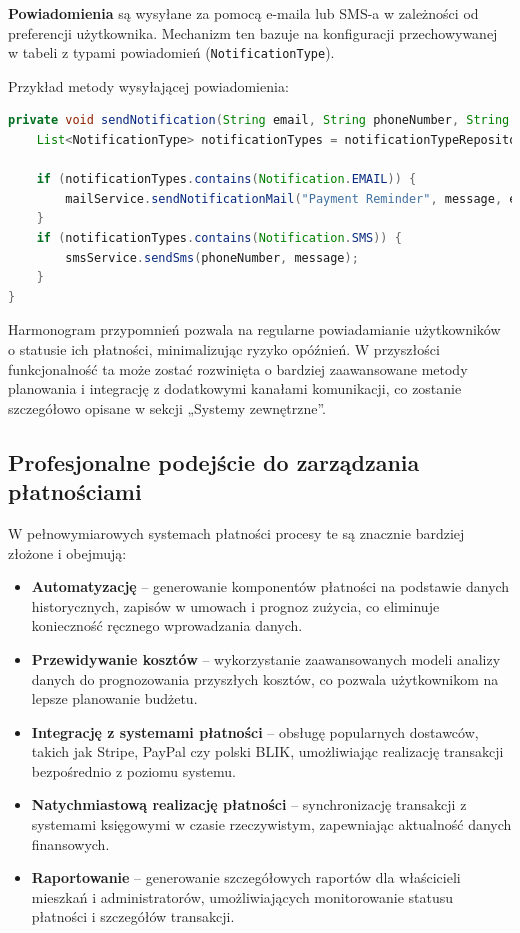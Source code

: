 \textbf{Powiadomienia} są wysyłane za pomocą e-maila lub SMS-a w zależności od preferencji użytkownika. Mechanizm ten bazuje na konfiguracji przechowywanej w tabeli z typami powiadomień (\texttt{NotificationType}).

Przykład metody wysyłającej powiadomienia:
\begin{lstlisting}[language=Java, caption=Wysyłanie powiadomień]
private void sendNotification(String email, String phoneNumber, String message) {
    List<NotificationType> notificationTypes = notificationTypeRepository.findByUserEmail(email);

    if (notificationTypes.contains(Notification.EMAIL)) {
        mailService.sendNotificationMail("Payment Reminder", message, email);
    }
    if (notificationTypes.contains(Notification.SMS)) {
        smsService.sendSms(phoneNumber, message);
    }
}
\end{lstlisting}

Harmonogram przypomnień pozwala na regularne powiadamianie użytkowników o statusie ich płatności, minimalizując ryzyko opóźnień. W przyszłości funkcjonalność ta może zostać rozwinięta o bardziej zaawansowane metody planowania i integrację z dodatkowymi kanałami komunikacji, co zostanie szczegółowo opisane w sekcji „Systemy zewnętrzne”.

\subsection{Profesjonalne podejście do zarządzania płatnościami}

W pełnowymiarowych systemach płatności procesy te są znacznie bardziej złożone i obejmują:
\begin{itemize}
    \item \textbf{Automatyzację} -- generowanie komponentów płatności na podstawie danych historycznych, zapisów w umowach i prognoz zużycia, co eliminuje konieczność ręcznego wprowadzania danych.
    \item \textbf{Przewidywanie kosztów} -- wykorzystanie zaawansowanych modeli analizy danych do prognozowania przyszłych kosztów, co pozwala użytkownikom na lepsze planowanie budżetu.
    \item \textbf{Integrację z systemami płatności} -- obsługę popularnych dostawców, takich jak Stripe, PayPal czy polski BLIK, umożliwiając realizację transakcji bezpośrednio z poziomu systemu.
    \item \textbf{Natychmiastową realizację płatności} -- synchronizację transakcji z systemami księgowymi w czasie rzeczywistym, zapewniając aktualność danych finansowych.
    \item \textbf{Raportowanie} -- generowanie szczegółowych raportów dla właścicieli mieszkań i administratorów, umożliwiających monitorowanie statusu płatności i szczegółów transakcji.
\end{itemize}

